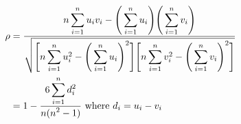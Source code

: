         \begin{align}
            \label{eq:spearman}
            \rho    &= \frac{\displaystyle n\sum_{i=1}^n u_i v_i - \Bigg( \sum_{i=1}^n u_i \Bigg) \Bigg( \sum_{i=1}^n v_i \Bigg)}{\displaystyle \sqrt{\Bigg[ n \sum_{i=1}^n u_i^2 - \Bigg( \sum_{i=1}^n u_i \Bigg)^2 \Bigg] \Bigg[ n \sum_{i=1}^n v_i^2 - \Bigg( \sum_{i=1}^n v_i \Bigg)^2 \Bigg] }}\\
            \label{eq:spearmantied}            
                    &= 1 - \frac{\displaystyle 6 \sum_{i=1}^n d_i^2}{\displaystyle n(n^2 - 1)}\ \text{where}\ d_i = u_i - v_i
        \end{align}
